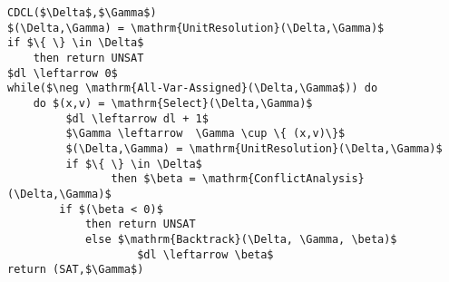 \begin{lstlisting}[caption = Example CDCL Algorithm, mathescape]
CDCL($\Delta$,$\Gamma$)
$(\Delta,\Gamma) = \mathrm{UnitResolution}(\Delta,\Gamma)$
if $\{ \} \in \Delta$
	then return UNSAT
$dl \leftarrow 0$
while($\neg \mathrm{All-Var-Assigned}(\Delta,\Gamma$)) do
	do $(x,v) = \mathrm{Select}(\Delta,\Gamma)$
 	     $dl \leftarrow dl + 1$
 	     $\Gamma \leftarrow  \Gamma \cup \{ (x,v)\}$
	     $(\Delta,\Gamma) = \mathrm{UnitResolution}(\Delta,\Gamma)$
	     if $\{ \} \in \Delta$
              	then $\beta = \mathrm{ConflictAnalysis}(\Delta,\Gamma)$
		if $(\beta < 0)$
			then return UNSAT
			else $\mathrm{Backtrack}(\Delta, \Gamma, \beta)$
			        $dl \leftarrow \beta$
return (SAT,$\Gamma$)
\end{lstlisting}


\begin{comment}

Resolution Proof System


\begin{mydef}[Resolution Proof System] The derivable resolution sequents $\Gamma \modres{n} C$ with a derivation of size $n$ are conveniently defined by two rules: Subsumption (or axiom) and resolution.
%
\bigskip

\label{def:resolutionps}
\begin{center}
\AxiomC{\phantom{$\Delta \modres{n} C \vee l$}}
\RightLabel{($\Sub$)  $C \subseteq C'$ }
\UnaryInfC{$\Delta,C \modres{0} C'$}
\DisplayProof
%
\qquad
%
\AxiomC{$\Delta \modres{n} C \vee l$}
\AxiomC{$ \Delta \modres{m} C' \vee \bar{l}$}
\RightLabel{($\Res$)}
\BinaryInfC{$\Delta \modres{n + m + 1} C \vee C'$}
\DisplayProof 
\end{center}
\bigskip
\end{mydef}

\end{comment}

\begin{comment}
\section{Translation to CNF}
In order to apply most modern SAT solvers typically one has to first encode the SAT problem as a CNF formula. There are a number of translations available, some naive approaches can exponentially increase the size of the resulting formula. In the following we look at the most commonly used encoding called the Tseitin Expansion \cite{GT83}.


\section{The Future: Satisfiability Modulo Theory}
More recently a new type of solver has emerged that can deal with first order formulae, these solvers are based on SAT algorithms and include extra theory modules for reasoning about arithmetic,arrays, quantifiers and equality, hence the name \emph{satisfiability modulo theory}.
\end{comment}